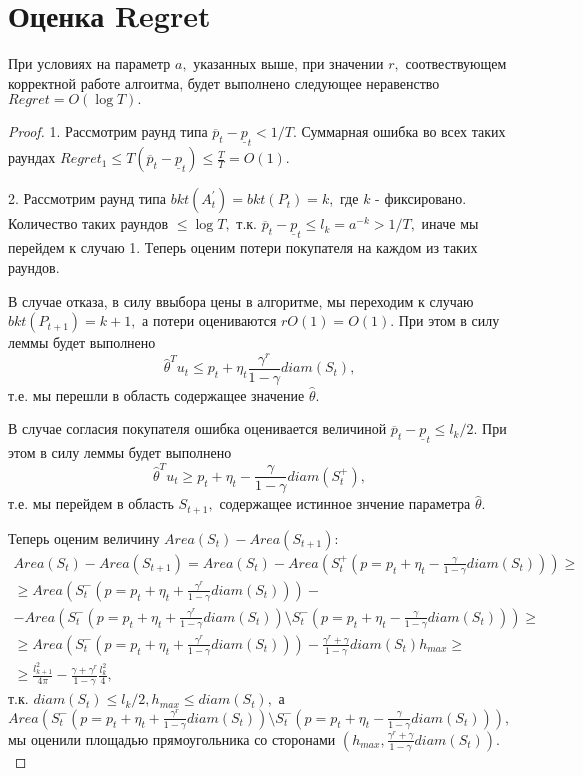 \documentclass[12 pt, russian]{article}
\begin{document}
\section{Оценка Regret}
\statement
При условиях на параметр $a,$ указанных выше, при значении $r,$ соотвествующем корректной работе алгоитма, будет выполнено следующее неравенство $Regret = O(\log{T}).$
\begin{proof}
1. Рассмотрим раунд типа $\overline{p}_t - \underline{p}_t < 1 / T.$ Суммарная ошибка во всех таких раундах $Regret_1 \leq T (\overline{p}_t - \underline{p}_t) \leq \frac{T}{T} = O(1).$

2. Рассмотрим раунд типа $bkt(A^{'}_t) = bkt(P_t) = k,$ где $k$ - фиксировано. Количество таких раундов $\leq \log{T},$ т.к. $\overline{p}_t - \underline{p}_t \leq l_k = a^{-k} > 1 / T,$ иначе мы перейдем к случаю 1. Теперь оценим потери покупателя на каждом из таких раундов.

В случае отказа, в силу ввыбора цены в алгоритме, мы переходим к случаю $bkt(P_{t + 1}) = k + 1,$ а потери оцениваются $r O(1) = O(1).$ При этом в силу леммы будет выполнено $$\hat{\theta}^T u_t \leq p_t + \eta_t \frac{\gamma^r}{1 - \gamma} diam(S_t),$$ т.е. мы перешли в область содержащее значение $\hat{\theta}.$

В случае согласия покупателя ошибка оценивается величиной $\overline{p}_t - \underline{p}_t \leq l_k / 2.$ При этом в силу леммы будет выполнено $$\hat{\theta}^T u_t \geq p_t + \eta_t - \frac{\gamma}{1 - \gamma} diam(S^{+}_t),$$ т.е. мы перейдем в область $S_{t + 1},$ содержащее истинное знчение параметра $\hat{\theta}.$

Теперь оценим величину $Area(S_t) - Area(S_{t + 1}):$
\begin{gather*}
    Area(S_t) - Area(S_{t + 1}) = Area(S_t) - Area(S^{+}_t(p = p_t + \eta_t - \frac{\gamma}{1 - \gamma}diam(S_t))) \geq \\
    \geq Area(S^{-}_t(p = p_t + \eta_t + \frac{\gamma^r}{1 - \gamma}diam(S_t))) - \\
    - Area(S^{-}_t(p = p_t + \eta_t + \frac{\gamma^r}{1 - \gamma}diam(S_t)) \setminus S^{-}_t(p = p_t + \eta_t - \frac{\gamma}{1 - \gamma}diam(S_t))) \geq \\
    \geq Area(S^{-}_t(p = p_t + \eta_t + \frac{\gamma^r}{1 - \gamma}diam(S_t))) - \frac{\gamma^r + \gamma}{1 - \gamma} diam(S_t) h_{max} \geq \\
    \geq \frac{l^2_{k + 1}}{4 \pi} - \frac{\gamma + \gamma^r}{1 - \gamma} \frac{l^2_k}{4},
\end{gather*}
т.к.
$diam(S_t) \leq l_k / 2, h_{max} \leq diam(S_t),$ а $Area(S^{-}_t(p = p_t + \eta_t + \frac{\gamma^r}{1 - \gamma}diam(S_t)) \setminus S^{-}_t(p = p_t + \eta_t - \frac{\gamma}{1 - \gamma}diam(S_t))),$ мы оценили площадью прямоугольника со сторонами $(h_{max}, \frac{\gamma^r + \gamma}{1 - \gamma}diam(S_t)).$


\end{proof}
\end{document}
